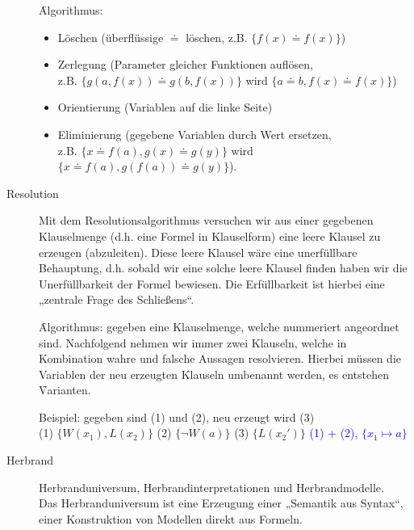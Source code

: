 \begin{description}
            \f{Algorithmus:}
            \begin{itemize}
                \item Löschen (überflüssige $\doteq$ löschen, z.B. $\{ f(x) \doteq f(x) \}$)
                \item Zerlegung (Parameter gleicher Funktionen auflösen, \\
                    z.B. $\{g(a, f(x)) \doteq g(b, f(x))\}$ wird $\{a \doteq b, f(x) \doteq f(x) \}$)
                \item Orientierung (Variablen auf die linke Seite)
                \item Eliminierung (gegebene Variablen durch Wert ersetzen, \\
                    z.B. $\{ x \doteq f(a), g(x) \doteq g(y) \}$ wird $\{ x \doteq f(a), g(f(a)) \doteq g(y)\}$).
            \end{itemize}

        \item[Resolution]
            Mit dem Resolutionsalgorithmus versuchen wir aus einer gegebenen Klauselmenge (d.h. eine Formel in Klauselform) eine leere Klausel zu erzeugen (abzuleiten). Diese leere Klausel wäre eine unerfüllbare Behauptung, d.h. sobald wir eine solche leere Klausel finden haben wir die Unerfüllbarkeit der Formel bewiesen. Die Erfüllbarkeit ist hierbei eine „zentrale Frage des Schließens“.

            \f{Algorithmus:} gegeben eine Klauselmenge, welche nummeriert angeordnet sind.
            Nachfolgend nehmen wir immer zwei Klauseln, welche in Kombination wahre und falsche Aussagen resolvieren. Hierbei müssen die Variablen der neu erzeugten Klauseln umbenannt werden, es entstehen \f{Varianten}.   

            Beispiel: gegeben sind (1) und (2), neu erzeugt wird (3) \\
            (1) $\{ W(x_{1}), L(x_{2}) \}$ \hspace{1cm}
            (2) $\{ \neg W(a)\}$ \hspace{1cm}
            (3) $\{ L(x_{2}')\}$ \textcolor{blue}{(1) + (2), $\{ x_{1} \mapsto a \}$} \\

        \item[Herbrand] Herbranduniversum, Herbrandinterpretationen und Herbrandmodelle.  \\
            Das Herbranduniversum ist eine Erzeugung einer „Semantik aus Syntax“, einer Konstruktion von Modellen direkt aus Formeln.


\end{description}
